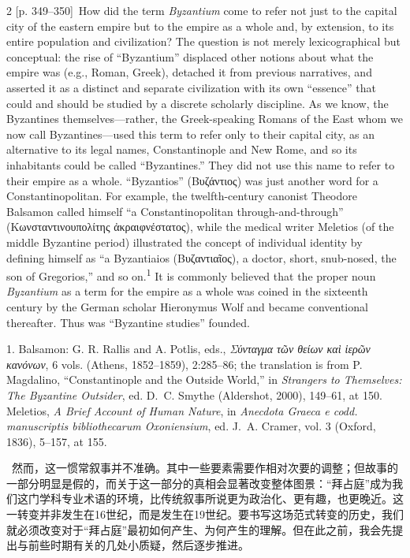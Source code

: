 \documentclass[10pt,a4paper]{article}
\begin{document}
\begin{paracol}{2}
{\scriptsize\color{gray}[p. 349–350]}\ How did the term \textit{Byzantium} come to refer not just to the capital city of the eastern empire but to the empire as a whole and, by extension, to its entire population and civilization? The question is not merely lexicographical but conceptual: the rise of “Byzantium” displaced other notions about what the empire was (e.g., Roman, Greek), detached it from previous narratives, and asserted it as a distinct and separate civilization with its own “essence” that could and should be studied by a discrete scholarly discipline. As we know, the Byzantines themselves—rather, the Greek-speaking Romans of the East whom we now call Byzantines—used this term to refer only to their capital city, as an alternative to its legal names, Constantinople and New Rome, and so its inhabitants could be called “Byzantines.” They did not use this name to refer to their empire as a whole. “Byzantios” (Βυζάντιος) was just another word for a Constantinopolitan. For example, the twelfth-century canonist Theodore Balsamon called himself “a Constantinopolitan through-and-through” (Κωνσταντινουπολίτης ἀκραιφνέστατος), while the medical writer Meletios (of the middle Byzantine period) illustrated the concept of individual identity by defining himself as “a Byzantiaios (Βυζαντιαῖος), a doctor, short, snub-nosed, the son of Gregorios,” and so on.\nobreak\textsuperscript{1} It is commonly believed that the proper noun \textit{Byzantium} as a term for the empire as a whole was coined in the sixteenth century by the German scholar Hieronymus Wolf and became conventional thereafter. Thus was “Byzantine studies” founded.\par{\small 1.  Balsamon: G. R. Rallis and A. Potlis, eds., \textit{Σύνταγμα τῶν θείων καὶ ἱερῶν κανόνων}, 6 vols. (Athens, 1852–1859), 2:285–86; the translation is from P. Magdalino, “Constantinople and the Outside World,” in \textit{Strangers to Themselves: The Byzantine Outsider}, ed.\textit{ }D. C. Smythe (Aldershot, 2000), 149–61, at 150. Meletios, \textit{A Brief Account of Human Nature}, in \textit{Anecdota Graeca e codd. manuscriptis bibliothecarum Oxoniensium}, ed. J. A. Cramer, vol. 3 (Oxford, 1836), 5–157, at 155.\par}
\switchcolumn*
{\scriptsize\color{gray}[p. 350]}\ 然而，这一惯常叙事并不准确。其中一些要素需要作相对次要的调整；但故事的一部分明显是假的，而关于这一部分的真相会显著改变整体图景：“拜占庭”成为我们这门学科专业术语的环境，比传统叙事所说更为政治化、更有趣，也更晚近。这一转变并非发生在16世纪，而是发生在19世纪。要书写这场范式转变的历史，我们就必须改变对于“拜占庭”最初如何产生、为何产生的理解。但在此之前，我会先提出与前些时期有关的几处小质疑，然后逐步推进。\par

\end{paracol}
\end{document}
